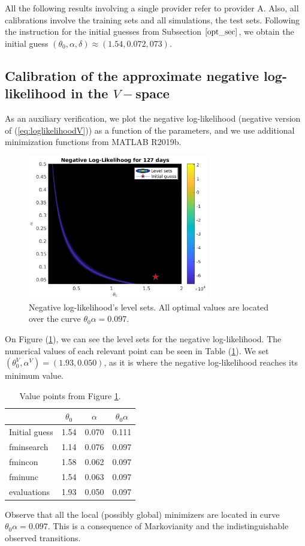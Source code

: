 \documentclass[11pt]{article}
\theoremstyle{definition}
\begin{document}
All the following results involving a single provider refer to provider A. Also, all calibrations involve the training sets and all simulations, the test sets. Following the instruction for the initial guesses from Subsection $\ref{opt_sec}$, we obtain the initial guess $(\theta_0,\alpha,\delta)\approx(1.54,0.072,073)$.

\subsection{Calibration of the approximate negative log-likelihood in the $V-$space}

As an auxiliary verification, we plot the negative log-likelihood (negative version of (\ref{eq:loglikelihoodV})) as a function of the parameters, and we use additional minimization functions from MATLAB R2019b.

\begin{figure}[H]
\centering
\includegraphics[width=0.7\textwidth]{../../MATLAB_Files/Results/likelihood/normal/Log-Likelihood.eps}
\caption{Negative log-likelihood's level sets. All optimal values are located over the curve $\theta_0\alpha=0.097$.}
\label{fig:neg-LL}
\end{figure}
On Figure (\ref{fig:neg-LL}), we can see the level sets for the negative log-likelihood. The numerical values of each relevant point can be seen in Table (\ref{tab:optimal_values}). We set $(\theta_0^V,\alpha^V)=(1.93,0.050)$, as it is where the negative log-likelihood reaches its minimum value.
\begin{table}[H]
\centering
\begin{tabular}{lccc}
\toprule
 & $\theta_0$ & $\alpha$ & $\theta_0\alpha$\\
 \midrule
 Initial guess & 1.54 & 0.070 & 0.111 \\
 fminsearch & 1.14 & 0.076 & 0.097 \\
 fmincon & 1.58 & 0.062 & 0.097 \\
 fminunc & 1.54 & 0.063 & 0.097 \\
 evaluations & 1.93 & 0.050 & 0.097 \\
 \bottomrule
\end{tabular}
\caption{Value points from Figure \ref{fig:neg-LL}.}
\label{tab:optimal_values}
\end{table}
Observe that all the local (possibly global) minimizers are located in curve $\theta_0\alpha=0.097$. {\color{red}This is a consequence of Markovianity and the indistinguishable observed transitions.}
\end{document}
